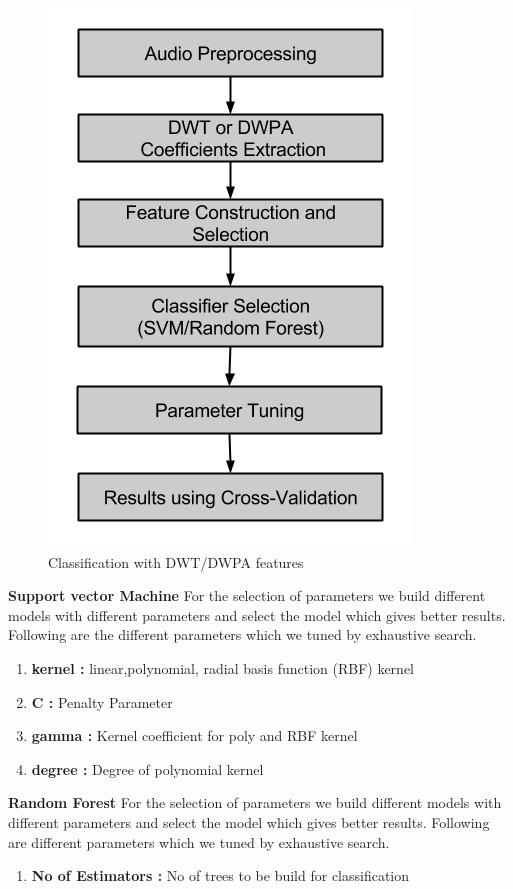 \documentclass[11pt]{report}
\begin{document}
\begin{figure}[h]
\centering
\includegraphics[scale=.6]{./images/dwt_flow.png}
\caption{Classification with DWT/DWPA features}
\end{figure}
\textbf{Support vector Machine}
For the selection of parameters we build different models with different parameters and select the model which gives better results. Following are the different parameters which we tuned by exhaustive search.
\begin{enumerate}
\item \textbf{kernel :} linear,polynomial, radial basis function (RBF) kernel
\item \textbf{C :} Penalty Parameter 
\item \textbf{gamma :} Kernel coefficient for poly and RBF kernel
\item \textbf{degree :} Degree of polynomial kernel
\end{enumerate}

\textbf{Random Forest}
For the selection of parameters we build different models with different parameters and select the model which gives better results. Following are different parameters which we tuned by exhaustive search.
\begin{enumerate}
\item \textbf{No of Estimators :} No of trees to be build for classification
\end{enumerate}
\end{document}
